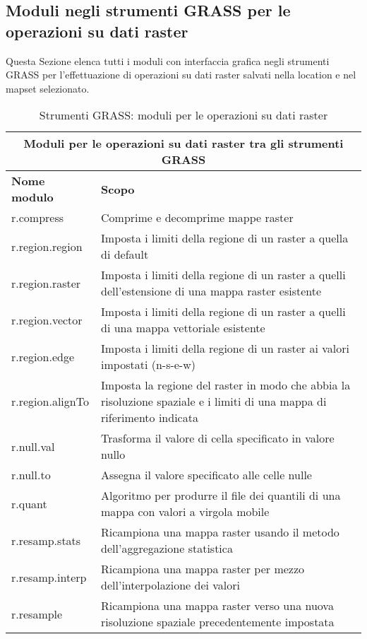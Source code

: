 \clearpage

\subsection{Moduli negli strumenti GRASS per le operazioni su dati raster}

Questa Sezione elenca tutti i moduli con interfaccia grafica negli strumenti GRASS per l'effettuazione di operazioni su dati raster salvati nella location e nel mapset selezionato.

\begin{table}[ht]
\centering
\caption{Strumenti GRASS: moduli per le operazioni su dati raster}\medskip
 \begin{tabular}{|p{4cm}|p{12cm}|}
  \hline \multicolumn{2}{|c|}{\textbf{Moduli per le operazioni su dati raster tra gli strumenti GRASS}} \\
  \hline \textbf{Nome modulo} & \textbf{Scopo} \\
  \hline r.compress & Comprime e decomprime mappe raster \\
  \hline r.region.region & Imposta i limiti della regione di un raster a quella di default \\
  \hline r.region.raster & Imposta i limiti della regione di un raster a quelli dell'estensione di una mappa raster esistente \\
  \hline r.region.vector & Imposta i limiti della regione di un raster a quelli di una mappa vettoriale esistente \\
  \hline r.region.edge & Imposta i limiti della regione di un raster ai valori impostati (n-s-e-w) \\
  \hline r.region.alignTo & Imposta la regione del raster in modo che abbia la risoluzione spaziale e i limiti di una mappa di riferimento indicata \\
  \hline r.null.val & Trasforma il valore di cella specificato in valore nullo \\
  \hline r.null.to & Assegna il valore specificato alle celle nulle \\
  \hline r.quant & Algoritmo per produrre il file dei quantili di una mappa con valori a virgola mobile \\
  \hline r.resamp.stats & Ricampiona una mappa raster usando il metodo dell'aggregazione statistica \\
  \hline r.resamp.interp & Ricampiona una mappa raster per mezzo dell'interpolazione dei valori \\
  \hline r.resample & Ricampiona una mappa raster verso una nuova risoluzione spaziale precedentemente impostata \\

\end{tabular}
\end{table}
